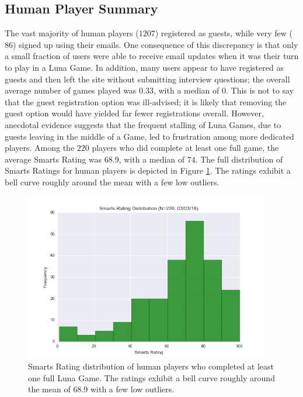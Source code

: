 \subsection{Human Player Summary}

The vast majority of human players ($1207$) registered as guests, while very few ($86$) signed up using their emails. One consequence of this discrepancy is that only a small fraction of users were able to receive email updates when it was their turn to play in a Luna Game. In addition, many users appear to have registered as guests and then left the site without submitting interview questions; the overall average number of games played was $0.33$, with a median of $0$. This is not to say that the guest registration option was ill-advised; it is likely that removing the guest option would have yielded far fewer registrations overall. However, anecdotal evidence suggests that the frequent stalling of Luna Games, due to guests leaving in the middle of a Game, led to frustration among more dedicated players. Among the $220$ players who did complete at least one full game, the average Smarts Rating was $68.9$, with a median of $74$. The full distribution of Smarts Ratings for human players is depicted in Figure \ref{humansmartsratings}. The ratings exhibit a bell curve roughly around the mean with a few low outliers. 


\begin{figure}
\includegraphics[width=0.95\textwidth]{figures/ratingDistribution.png}
\caption{\label{humansmartsratings} Smarts Rating distribution of human players who completed at least one full Luna Game. The ratings exhibit a bell curve roughly around the mean of $68.9$ with a few low outliers.}
\end{figure}

